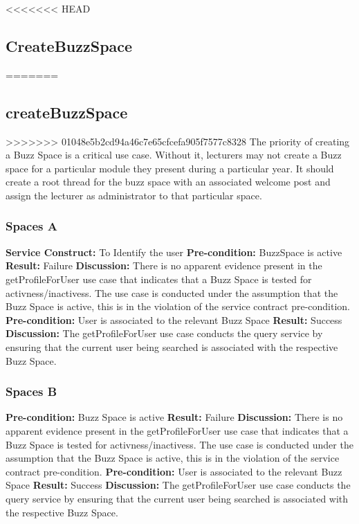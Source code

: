
<<<<<<< HEAD
\subsection{CreateBuzzSpace}
=======
\subsection{createBuzzSpace}
>>>>>>> 01048e5b2cd94a46c7e65cfcefa905f7577c8328
The priority of creating a Buzz Space is a critical use case. Without it, lecturers may not create a Buzz space for a particular module they present during a particular year. It should create a root thread for the buzz space with an associated welcome post and assign the lecturer as administrator to that particular space.

\subsubsection{Spaces A}
\textbf{Service Construct:}  To Identify the user \newline
\textbf{Pre-condition:}  BuzzSpace is active \newline
\textbf{Result:}  Failure \newline
\textbf{Discussion:}  There is no apparent evidence present in the getProfileForUser use case that indicates that a Buzz Space is tested for activness/inactivess.
The use case is conducted under the assumption that the Buzz Space is active, this is in the violation of the service contract pre-condition. \newline \newline
\textbf{Pre-condition:}  User is associated to the relevant Buzz Space\newline
\textbf{Result:}  Success \newline
\textbf{Discussion:}  The getProfileForUser use case conducts the query service by ensuring that the current user being searched is associated with the respective Buzz Space.
\subsubsection{Spaces B}
\textbf{Pre-condition:}  Buzz Space is active \newline
\textbf{Result:}  Failure \newline
\textbf{Discussion:}  There is no apparent evidence present in the getProfileForUser use case that indicates that a Buzz Space is tested for activness/inactivess.
The use case is conducted under the assumption that the Buzz Space is active, this is in the violation of the service contract pre-condition. \newline \newline
\textbf{Pre-condition:}  User is associated to the relevant Buzz Space\newline
\textbf{Result:}  Success \newline
\textbf{Discussion:}  The getProfileForUser use case conducts the query service by ensuring that the current user being searched is associated with the respective Buzz Space.

